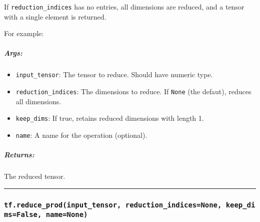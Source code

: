 If \texttt{reduction\_indices} has no entries, all dimensions are
reduced, and a tensor with a single element is returned.

For example:

\begin{Shaded}
\begin{Highlighting}[]
\CommentTok{#         [1, 1, 1]]}
\OperatorTok{==>} 
\NormalTok{) }\OperatorTok{==>} \NormalTok{[}\NormalTok{, }\NormalTok{, }\NormalTok{]}
\NormalTok{) }\OperatorTok{==>} \NormalTok{[}\NormalTok{, }\NormalTok{]}
\OperatorTok{=}\NormalTok{) }\OperatorTok{==>} \NormalTok{[[}\NormalTok{], [}\NormalTok{]]}
\NormalTok{tf.reduce_sum(x, [}\NormalTok{, }\NormalTok{]) }\OperatorTok{==>} 
\end{Highlighting}
\end{Shaded}

\subparagraph{Args: }\label{args-38}

\begin{itemize}
\tightlist
\item
  \texttt{input\_tensor}: The tensor to reduce. Should have numeric
  type.
\item
  \texttt{reduction\_indices}: The dimensions to reduce. If
  \texttt{None} (the defaut), reduces all dimensions.
\item
  \texttt{keep\_dims}: If true, retains reduced dimensions with length
  1.
\item
  \texttt{name}: A name for the operation (optional).
\end{itemize}

\subparagraph{Returns: }\label{returns-38}

The reduced tensor.

\begin{center}\rule{0.5\linewidth}{\linethickness}\end{center}

\subsubsection{\texorpdfstring{\texttt{tf.reduce\_prod(input\_tensor,\ reduction\_indices=None,\ keep\_dims=False,\ name=None)}
}{tf.reduce\_prod(input\_tensor, reduction\_indices=None, keep\_dims=False, name=None) }}\label{tf.reduceux5fprodinputux5ftensor-reductionux5findicesnone-keepux5fdimsfalse-namenone}

